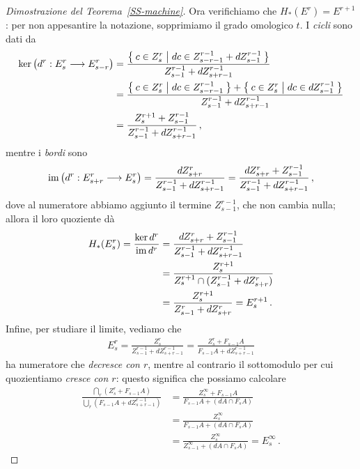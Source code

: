 \begin{proof}[Dimostrazione del Teorema~\ref{SS-machine}]
		Ora verifichiamo che $H_{*}(E^{r}) = E^{r+1}$: 
		per non appesantire la notazione, sopprimiamo il grado omologico $t$.
		I \emph{cicli} sono dati da
		\begin{align*}
			\ker \left( d^{r}: E^{r}_{s} \longrightarrow E^{r}_{s-r} \right)
			&= \frac{\Set{c \in Z^{r}_{s} | dc \in Z^{r-1}_{s-r-1} + dZ^{r-1}_{s-1}}}{Z^{r-1}_{s-1} + dZ^{r-1}_{s+r-1}} \\
			&= \frac{\Set{c \in Z^{r}_{s} | dc \in Z^{r-1}_{s-r-1}} + \Set{c \in Z^{r}_{s} | dc \in dZ^{r-1}_{s-1}}}{Z^{r-1}_{s-1} + dZ^{r-1}_{s+r-1}} \\
			&= \frac{Z^{r+1}_{s} + Z_{s-1}^{r-1}}{Z^{r-1}_{s-1} + dZ^{r-1}_{s+r-1}}\,,
		\end{align*}
		mentre i \emph{bordi} sono
		\begin{align*}
			\operatorname{im} \left( d^{r} : E^{r}_{s+r} \longrightarrow E^{r}_{s} \right)
			= \frac{dZ_{s+r}^{r}}{Z^{r-1}_{s-1} + dZ_{s+r-1}^{r-1}} 
			= \frac{dZ_{s+r}^{r} + Z^{r-1}_{s-1}}{Z^{r-1}_{s-1} + dZ_{s+r-1}^{r-1}}\,,
		\end{align*}
		dove al numeratore abbiamo aggiunto il termine $Z^{r-1}_{s-1}$,
		che non cambia nulla; allora il loro quoziente dà
		\begin{align*}
			H_{*}(E^{r}_{s}) = \frac{\ker d^{r}}{\operatorname{im} d^{r}}
			&= \frac{dZ_{s+r}^{r} + Z^{r-1}_{s-1}}{Z^{r-1}_{s-1} + dZ_{s+r-1}^{r-1}} \\
			&= \frac{Z^{r+1}_{s}}{Z_{s}^{r+1} \cap (Z^{r-1}_{s-1} + dZ_{s+r}^{r})} \\
			&= \frac{Z^{r+1}_{s}}{Z^{r}_{s-1} + dZ_{s+r}^{r}} = E^{r+1}_{s}\,.
		\end{align*}
		Infine, per studiare il limite, vediamo che
		\begin{align*}
			E^{r}_{s} 
			= \frac{Z^{r}_{s}}{Z^{r-1}_{s-1} + dZ_{s+r-1}^{r-1}} 
			= \frac{Z^{r}_{s} + F_{s-1}A}{F_{s-1}A + dZ_{s+r-1}^{r-1}}
		\end{align*}
		ha numeratore che \emph{decresce con $r$},
		mentre al contrario il sottomodulo per cui quozientiamo
		\emph{cresce con $r$}: questo significa che possiamo calcolare
		\begin{align*}
			\frac{\bigcap_{r}(Z^{r}_{s} + F_{s-1}A)}{\bigcup_{r} (F_{s-1}A + dZ_{s+r-1}^{r-1})}
			&= \frac{Z^{\infty}_{s} + F_{s-1}A}{F_{s-1}A + (dA \cap F_{s}A)} \\
			&=  \frac{Z^{\infty}_{s}}{F_{s-1}A + (dA \cap F_{s}A)} \\
			&= \frac{Z^{\infty}_{s}}{Z^{\infty}_{s-1} + (dA \cap F_{s}A)} = E^{\infty}_{s}\,.
		\end{align*}

\end{proof}
